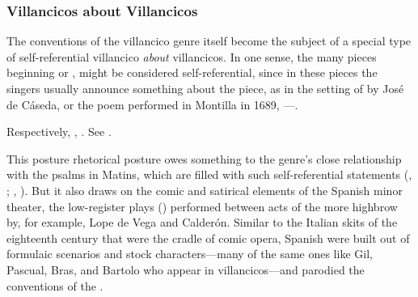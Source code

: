 \subsubsection{Villancicos about Villancicos}

The conventions of the villancico genre itself become the subject of a special
type of self-referential villancico \emph{about} villancicos.
In one sense, the many pieces beginning  or , might be considered self-referential, since in these pieces the
singers usually announce something about the piece, as in the setting of
 by José de Cáseda, or the poem performed in
Montilla in 1689, ---.%
\begin{Footnote}
    Respectively, , \autocite[116 (no signature
    listed)]{BNE:VCs17C}.
    See \autocite{LeGuin:Tonadilla}.
\end{Footnote}
This posture rhetorical posture owes something to the genre's close
relationship with the psalms in Matins, which are filled with such
self-referential statements (,
; ,
).
But it also draws on the comic and satirical elements of the Spanish minor
theater, the low-register plays () performed between acts of
the more highbrow  by, for example, Lope de Vega and Calderón.%
    \Autocite{Cotarelo:Entremeses}
Similar to the Italian  skits of the eighteenth
century that were the cradle of comic opera, Spanish  were
built out of formulaic scenarios and stock characters---many of the same ones
like Gil, Pascual, Bras, and Bartolo who appear in villancicos---and parodied
the conventions of the .

